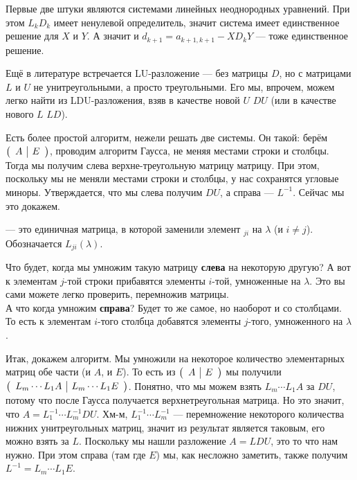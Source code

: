 \documentclass{article}
\begin{document}
\begin{itemize}
\begin{Proof}
            Первые две штуки являются системами линейных неоднородных уравнений. При этом $L_kD_k$ имеет ненулевой определитель, значит система имеет единственное решение для $X$ и $Y$. А значит и $d_{k+1}=a_{k+1,k+1}-XD_kY$ --- тоже единственное решение.
        \end{Proof}
        \begin{Comment}
            Ещё в литературе встречается LU-разложение --- без матрицы $D$, но с матрицами $L$ и $U$ не унитреугольными, а просто треугольными. Его мы, впрочем, можем легко найти из LDU-разложения, взяв в качестве новой $U$ $DU$ (или в качестве нового $L$ $LD$).
        \end{Comment}
        \begin{Comment}
            Есть более простой алгоритм, нежели решать две системы. Он такой: берём $\arr{c|c}{A & E}$, проводим алгоритм Гаусса, не меняя местами строки и столбцы. Тогда мы получим слева верхне-треугольную матрицу матрицу. При этом, поскольку мы не меняли местами строки и столбцы, у нас сохранятся угловые миноры. Утверждается, что мы слева получим $DU$, а справа --- $L^{-1}$. Сейчас мы это докажем.
        \end{Comment}
        \dfn {} --- это единичная матрица, в которой заменили элемент ${}_{ji}$ на $\lambda$ (и $i\neq j$). Обозначается $L_{ji}(\lambda)$.
        \begin{Comment}
            Что будет, когда мы умножим такую матрицу \textbf{слева} на некоторую другую? А вот к элементам $j$-той строки прибавятся элементы $i$-той, умноженные на $\lambda$. Это вы сами можете легко проверить, перемножив матрицы.\\
            А что когда умножим \textbf{справа}? Будет то же самое, но наоборот и со столбцами. То есть к элементам $i$-того столбца добавятся элементы $j$-того, умноженного на $\lambda$.
        \end{Comment}
        \begin{Proof}
            Итак, докажем алгоритм. Мы умножили на некоторое количество элементарных матриц обе части (и $A$, и $E$). То есть из $\arr{c|c}{A&E}$ мы получили $\arr{c|c}{L_m\cdots L_1A&L_m\cdots L_1E}$. Понятно, что мы можем взять $L_m\cdots L_1A$ за $DU$, потому что после Гаусса получается верхнетреугольная матрица. Но это значит, что $A=L_1^{-1}\cdots L_m^{-1}DU$. Хм-м, $L_1^{-1}\cdots L_m^{-1}$ --- перемножение некоторого количества нижних унитреугольных матриц, значит из результат является таковым, его можно взять за $L$. Поскольку мы нашли разложение $A=LDU$, это то что нам нужно. При этом справа (там где $E$) мы, как несложно заметить, также получим $L^{-1}=L_m\cdots L_1E$.

\end{Proof}
\end{itemize}
\end{document}
